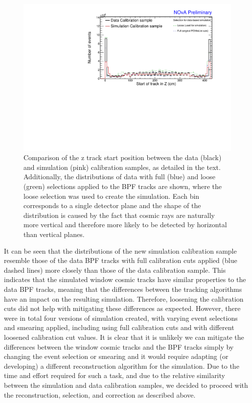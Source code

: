 \begin{figure}[!ht]
\includegraphics[clip, width=\textwidth]{Plots/TBCalibration/DBSim_DataMCComparison_StartZ.pdf}
\caption[Data-Simulation comparison of track start Z distribution]{Comparison of the z track start position between the data (black) and simulation (pink) calibration samples, as detailed in the text. Additionally, the distributions of data with full (blue) and loose (green) selections applied to the \acrshort{BPF} tracks are shown, where the loose selection was used to create the simulation. Each bin corresponds to a single detector plane and the shape of the distribution is caused by the fact that cosmic rays are naturally more vertical and therefore more likely to be detected by horizontal than vertical planes.}
\label{fig:DataBasedSimDataMCComparison_startZ}
\end{figure}

It can be seen that the distributions of the new simulation calibration sample resemble those of the data \gls{BPF} tracks with full calibration cuts applied (blue dashed lines) more closely than those of the data calibration sample. This indicates that the simulated window cosmic tracks have similar properties to the data \gls{BPF} tracks, meaning that the differences between the tracking algorithms have an impact on the resulting simulation. Therefore, loosening the calibration cuts did not help with mitigating these differences as expected. However, there were in total four versions of simulation created, with varying event selections and smearing applied, including using full calibration cuts and with different loosened calibration cut values. It is clear that it is unlikely we can mitigate the differences between the window cosmic tracks and the \gls{BPF} tracks simply by changing the event selection or smearing and it would require adapting (or developing) a different reconstruction algorithm for the simulation. Due to the time and effort required for such a task, and due to the relative similarity between the simulation and data calibration samples, we decided to proceed with the reconstruction, selection, and correction as described above.

